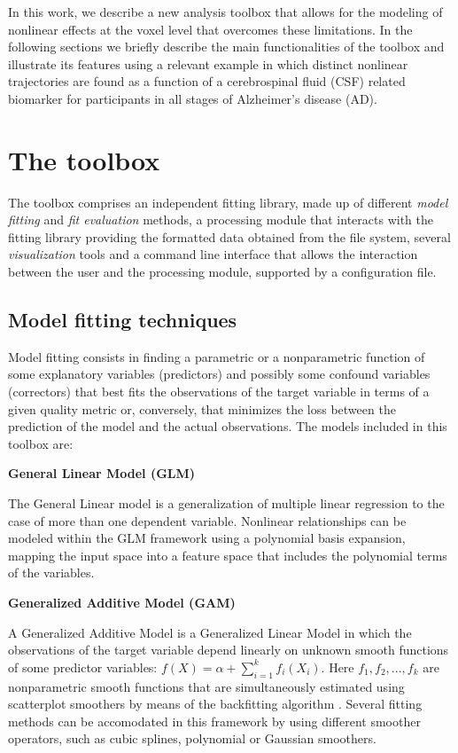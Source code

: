 \documentclass{article}
\begin{document}
In this work, we describe a new analysis toolbox that allows for the modeling of nonlinear effects at the voxel level that overcomes these limitations. In the following sections we briefly describe the main functionalities of the toolbox and illustrate its features using a relevant example in which distinct nonlinear trajectories are found as a function of a cerebrospinal fluid (CSF) related biomarker for participants in all stages of Alzheimer's disease (AD).


\section{The toolbox}
\label{toolbox}

The toolbox comprises an independent fitting library, made up of different \textit{model fitting} and \textit{fit evaluation} methods, a processing module that interacts with the fitting library providing the formatted data obtained from the file system, several \textit{visualization} tools and a command line interface that allows the interaction between the user and the processing module, supported by a configuration file. 

\subsection{Model fitting techniques}

Model fitting consists in finding a parametric or a nonparametric function of some explanatory variables (predictors) and possibly some confound variables (correctors) that best fits the observations of the target variable in terms of a given quality metric or, conversely, that minimizes the loss between the prediction of the model and the actual observations. The models included in this toolbox are:

\textbf{General Linear Model (GLM)} 

The General Linear model is a generalization of multiple linear regression to the case of more than one dependent variable. Nonlinear relationships can be modeled within the GLM framework using a polynomial basis expansion, mapping the input space into a feature space that includes the polynomial terms of the variables.

\textbf{Generalized Additive Model (GAM)} 

A Generalized Additive Model \cite{gam_Hastie_1990} is a Generalized Linear Model in which the observations of the target variable depend linearly on unknown smooth functions of some predictor variables: $ f(X) = \alpha + \sum_{i=1}^{k} f_i(X_i)$. Here $f_1, f_2, ..., f_k$ are nonparametric smooth functions that are simultaneously estimated using scatterplot smoothers by means of the backfitting algorithm \cite{breiman_backfit}. Several fitting methods can be accomodated in this framework by using different smoother operators, such as cubic splines, polynomial or Gaussian smoothers. 
\end{document}

